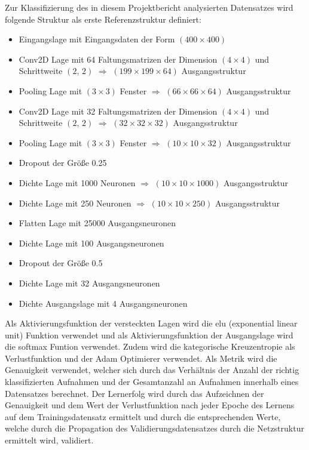 Zur Klassifizierung des in diesem Projektbericht analysierten Datensatzes wird folgende Struktur als erste Referenzstruktur definiert:
\begin{itemize}
 \item Eingangslage mit Eingangsdaten der Form $(400\times 400)$ 
 \item Conv2D Lage mit 64 Faltungsmatrizen der Dimension $(4 \times 4)$ und Schrittweite $(2,\,2)$ $\Rightarrow$ $(199 \times 199 \times 64)$ Ausgangsstruktur
 \item Pooling Lage mit $(3\times 3)$ Fenster $\Rightarrow$ $(66 \times 66 \times 64)$ Ausgangsstruktur
 \item Conv2D Lage mit 32 Faltungsmatrizen der Dimension $(4 \times 4)$ und Schrittweite $(2,\,2)$ $\Rightarrow$ $(32 \times 32 \times 32)$ Ausgangsstruktur
 \item Pooling Lage mit $(3\times 3)$ Fenster $\Rightarrow$ $(10 \times 10 \times 32)$ Ausgangsstruktur
 \item Dropout der Größe 0.25
 \item Dichte Lage mit 1000 Neuronen $\Rightarrow$ $(10 \times 10 \times 1000)$ Ausgangsstruktur
 \item Dichte Lage mit 250 Neuronen $\Rightarrow$ $(10 \times 10 \times 250)$ Ausgangsstruktur
 \item Flatten Lage mit 25000 Ausgangsneuronen
 \item Dichte Lage mit 100 Ausgangsneuronen
  \item Dropout der Größe 0.5
 \item Dichte Lage mit 32 Ausgangsneuronen
 \item Dichte Ausgangslage mit 4 Ausgangsneuronen
\end{itemize}
Als Aktivierungsfunktion der versteckten Lagen wird die elu (exponential linear unit) Funktion verwendet und als Aktivierungsfunktion der Ausgangslage wird die softmax Funtion verwendet. Zudem wird die kategorische Kreuzentropie als Verlustfunktion und der Adam Optimierer \cite{Adam} verwendet. Als Metrik wird die Genauigkeit verwendet, welcher sich durch das Verhältnis der Anzahl der richtig klassifizierten Aufnahmen und der Gesamtanzahl an Aufnahmen innerhalb eines Datensatzes berechnet. Der Lernerfolg wird durch das Aufzeichnen der Genauigkeit und dem Wert der Verlustfunktion nach jeder Epoche des Lernens auf dem Trainingsdatensatz ermittelt und durch die entsprechenden Werte, welche durch die Propagation des Validierungsdatensatzes durch die Netzstruktur ermittelt wird, validiert.\\
